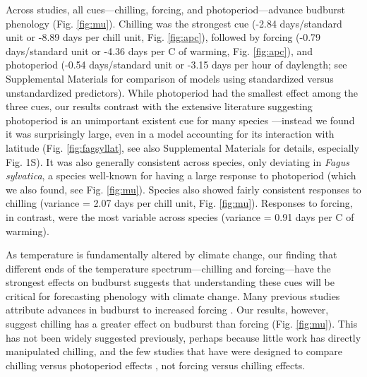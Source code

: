 \documentclass{article}
\begin{document}
\par Across studies, all cues---chilling, forcing, and photoperiod---advance budburst phenology (Fig. \ref {fig:mu}). Chilling was the strongest cue (-2.84 days/standard unit or -8.89 days per chill unit, Fig. \ref {fig:apc}), followed by forcing (-0.79 days/standard unit or -4.36 days per \degree C of warming, Fig. \ref {fig:apc}), and photoperiod (-0.54 days/standard unit or -3.15 days per hour of daylength; see Supplemental Materials for comparison of models using standardized versus unstandardized predictors). While photoperiod had the smallest effect among the three cues, our results contrast with the extensive literature suggesting photoperiod is an unimportant existent cue for many species \citep{zohner2016,koerner2010a}---instead we found it was surprisingly large, even in a model accounting for its interaction with latitude (Fig. \ref {fig:fagsyllat}, see also Supplemental Materials for details, especially Fig. 1S). It was also generally consistent across species, only deviating in  \emph{Fagus sylvatica}, a species well-known for having a large response to photoperiod (which we also found, see Fig. \ref {fig:mu}). Species also showed fairly consistent responses to chilling (variance = 2.07 days per chill unit, Fig. \ref {fig:mu}).
Responses to forcing, in contrast, were the most variable across species (variance = 0.91 days per \degree C of warming).

\par As temperature is fundamentally altered by climate change, our finding that different ends of the temperature spectrum---chilling and forcing---have the strongest effects on budburst suggests that understanding these cues will be critical for forecasting phenology with climate change. Many previous studies attribute advances in budburst to increased forcing \citep{Basler:2014aa,bradley1999,menzel2006,harrington2015}. %
Our results, however, suggest chilling has a greater effect on budburst than forcing (Fig. \ref{fig:mu}). This has not been widely suggested previously, perhaps because little work has directly manipulated chilling, and the few studies that have were designed to compare chilling versus photoperiod effects \citep[e.g., ][]{Basler:2014aa,Caffarra:2011qf,Laube:2014a,zohner2016}, not forcing versus chilling effects. 
\end{document}
